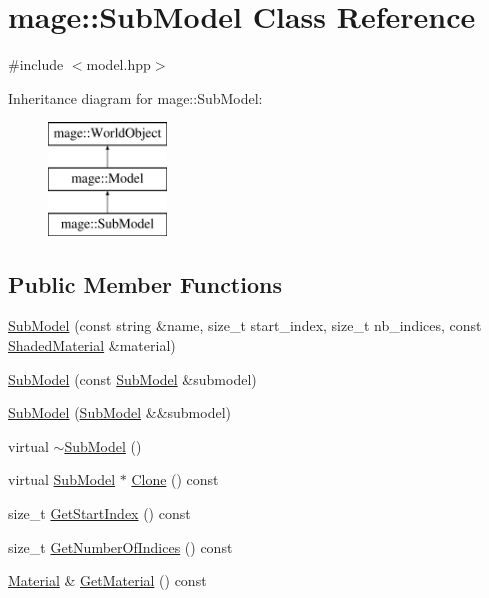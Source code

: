 \hypertarget{classmage_1_1_sub_model}{}\section{mage\+:\+:Sub\+Model Class Reference}
\label{classmage_1_1_sub_model}


{\ttfamily \#include $<$model.\+hpp$>$}

Inheritance diagram for mage\+:\+:Sub\+Model\+:\begin{figure}[H]
\begin{center}
\leavevmode
\includegraphics[height=3.000000cm]{classmage_1_1_sub_model}
\end{center}
\end{figure}
\subsection*{Public Member Functions}
\begin{DoxyCompactItemize}
\item 
\hyperlink{classmage_1_1_sub_model_a26dce7b076af1edb4209d0a236a250ef}{Sub\+Model} (const string \&name, size\+\_\+t start\+\_\+index, size\+\_\+t nb\+\_\+indices, const \hyperlink{structmage_1_1_shaded_material}{Shaded\+Material} \&material)
\item 
\hyperlink{classmage_1_1_sub_model_ae71dcb72fc1b06710b390c97a2db1d68}{Sub\+Model} (const \hyperlink{classmage_1_1_sub_model}{Sub\+Model} \&submodel)
\item 
\hyperlink{classmage_1_1_sub_model_a3813e71a2904ee9edf3e3788d96eb2c7}{Sub\+Model} (\hyperlink{classmage_1_1_sub_model}{Sub\+Model} \&\&submodel)
\item 
virtual \hyperlink{classmage_1_1_sub_model_a0e92faaeeeec8d4c55c67adf4a501d0d}{$\sim$\+Sub\+Model} ()
\item 
virtual \hyperlink{classmage_1_1_sub_model}{Sub\+Model} $\ast$ \hyperlink{classmage_1_1_sub_model_a368bcc2ee819cc29ec0203e314ae91d3}{Clone} () const
\item 
size\+\_\+t \hyperlink{classmage_1_1_sub_model_a2b901cb62dca26a7ff399719e0a4ba66}{Get\+Start\+Index} () const
\item 
size\+\_\+t \hyperlink{classmage_1_1_sub_model_a18736678fc1a5d882776298053e037b3}{Get\+Number\+Of\+Indices} () const
\item 
\hyperlink{structmage_1_1_material}{Material} \& \hyperlink{classmage_1_1_sub_model_af993f41f73a72df9fca154083c5f7410}{Get\+Material} () const
\end{DoxyCompactItemize}
